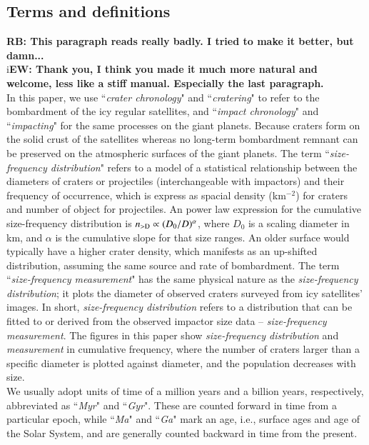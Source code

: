 \documentclass[preprint,12pt,3p,times,authoryear]{elsarticle}
\begin{document}
\subsection{Terms and definitions}
\label{term&def}
{\bf RB: This paragraph reads really badly. I tried to make it better, but damn...}\\
i{\bf EW: Thank you, I think you made it much more natural and welcome, less like a stiff manual.
Especially the last paragraph.} \\
In this paper, we use ``{\it crater chronology}" and ``{\it cratering}" to refer to the bombardment of the icy regular satellites, and ``{\it impact chronology}" and ``{\it impacting}" for the same processes on the giant planets. Because craters form on the solid crust of the satellites whereas no long-term bombardment remnant can be preserved on the atmospheric surfaces of the giant planets. The term
``{\it size-frequency distribution}" refers to a model of a statistical relationship between the diameters of craters or projectiles (interchangeable with impactors) and their frequency of occurrence, which is express as spacial density (km$^{-2}$) for craters and number of object for projectiles.
An power law expression for the cumulative size-frequency distribution is $n_{\rm >D} \propto (D_0/D)^\alpha$, %
where $D_0$ is a scaling diameter in km, and $\alpha$ is the cumulative slope for that size ranges. 
An older surface would typically have a higher crater density, which manifests as an up-shifted distribution, assuming the same source and rate of bombardment. The term ``{\it size-frequency measurement}" has the same physical nature as the {\it size-frequency distribution}; it plots the diameter of observed craters surveyed from icy satellites' images. In short, {\it size-frequency distribution} refers to a distribution that can be fitted to or derived from the observed impactor size data -- {\it size-frequency measurement}. The figures in this paper show {\it size-frequency distribution} and {\it measurement} in cumulative frequency, where the number of craters larger than a specific diameter is plotted against diameter, and the population decreases with size. \\

We usually adopt units of time of a million years and a billion years, respectively, abbreviated as ``{\it Myr}" and ``{\it Gyr}". These are counted forward in time from a particular epoch, while ``{\it Ma}" and ``{\it Ga}" mark an age, i.e., surface ages and age of the Solar System, and are generally counted backward in time from the present.
\end{document}
